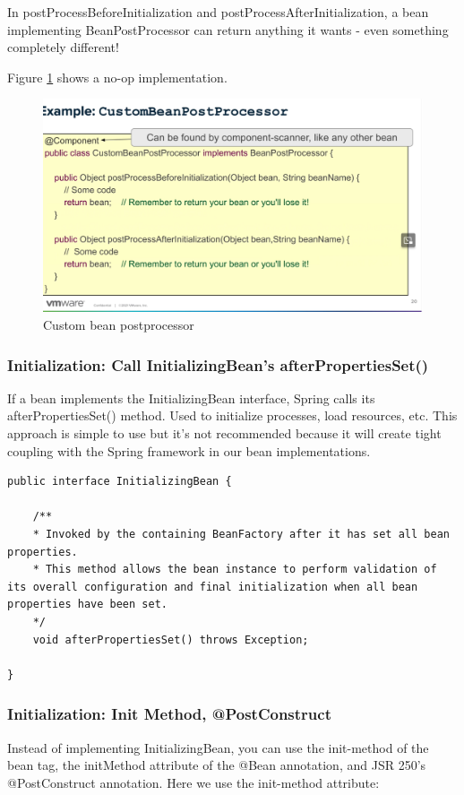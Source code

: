 \documentclass{scrartcl}
\begin{document}
In postProcessBeforeInitialization and postProcessAfterInitialization, a bean implementing BeanPostProcessor can return anything it wants - even something completely different!

Figure \ref{fig:custom_bean_postprocessor} shows a no-op implementation.

\begin{figure}
    \centering
    \includegraphics[width=1\linewidth]{custom_bean_postprocessor}
    \caption{Custom bean postprocessor}
    \label{fig:custom_bean_postprocessor}
\end{figure}

\subsubsection{Initialization: Call InitializingBean’s afterPropertiesSet()}
If a bean implements the InitializingBean interface, Spring calls its afterPropertiesSet() method. Used to initialize processes,  load resources, etc. This approach is simple to use but it’s not recommended because it will create tight coupling with the Spring framework in our bean implementations.

\begin{lstlisting}
public interface InitializingBean {

    /**
    * Invoked by the containing BeanFactory after it has set all bean properties.
    * This method allows the bean instance to perform validation of its overall configuration and final initialization when all bean properties have been set.
    */
    void afterPropertiesSet() throws Exception;

}
\end{lstlisting}

\subsubsection{Initialization: Init Method, @PostConstruct}
Instead of implementing InitializingBean, you can use the init-method of the bean tag, the initMethod attribute of the @Bean annotation, and JSR 250's @PostConstruct  annotation.
Here we use the init-method attribute:
\end{document}
